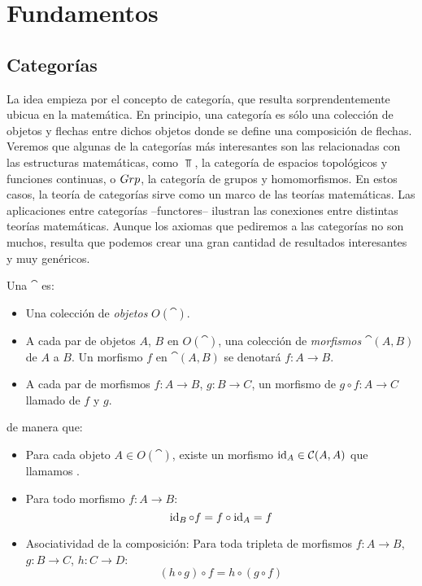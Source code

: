 \chapter{Fundamentos}
\section{Categorías}

La idea empieza por el concepto de categoría, que resulta sorprendentemente ubicua en la matemática.
En principio, una categoría es sólo una colección de objetos y flechas entre dichos objetos donde se define una composición de flechas.
Veremos que algunas de la categorías más interesantes son las relacionadas con las estructuras matemáticas, como $\Top$, la categoría de espacios topológicos y funciones continuas, o ${Grp}$, la categoría de grupos y homomorfismos.
En estos casos, la teoría de categorías sirve como un marco de las teorías matemáticas.
Las aplicaciones entre categorías --functores-- ilustran las conexiones entre distintas teorías matemáticas.
Aunque los axiomas que pediremos a las categorías no son muchos, resulta que podemos crear una gran cantidad de resultados interesantes y muy genéricos.

\begin{definition}
Una  $\cat$ es:
\begin{itemize}
\item Una colección de \emph{objetos} $O(\cat)$.
\item A cada par de objetos $A$, $B$ en $O(\cat)$, una colección de \emph{morfismos} $\cat(A,B)$ de $A$ a $B$.
Un morfismo $f$ en $\cat(A,B)$ se denotará $f \colon A \to B$.
\item A cada par de morfismos $f \colon A \to B$, $g \colon B \to C$, un morfismo de $g \circ f \colon A \to C$ llamado  de $f$ y $g$.
\end{itemize}
de manera que:
\begin{itemize}
\item Para cada objeto $A \in O(\cat)$, existe un morfismo $\operatorname{id}_A \in {\mathcal{C}}(A,A)$ que llamamos .
\item Para todo morfismo $f \colon A \to B$:
\[ \operatorname{id}_B \circ f = f \circ \operatorname{id}_A = f \]
\item Asociatividad de la composición: Para toda tripleta de morfismos $f \colon A \to B$, $g \colon B \to C$, $h \colon C \to D$:
\begin{equation}\label{cat:3} (h \circ g) \circ f = h \circ (g \circ f) \end{equation}
\end{itemize}
\end{definition}

